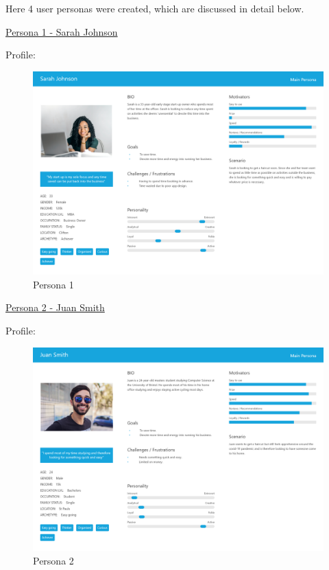 \documentclass[12pt]{article}
\begin{document}
	Here 4 user personas were created, which are discussed in detail below.
	\newline
	
		\underline{Persona 1 - Sarah Johnson}
		
		Profile: 
		\begin{figure}[H]
			\includegraphics[scale=0.2]{images/persona_1.png}
			\caption{Persona 1}
			\label{fig:persona_1}
		\end{figure}
	

		
		\underline{Persona 2 - Juan Smith}
		
		
		Profile: 
		\begin{figure}[H]			
			\includegraphics[scale=0.2]{images/persona_2.png}
			\caption{Persona 2}
			\label{fig:persona_2}
		\end{figure}
		
\end{document}
